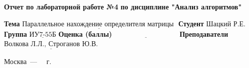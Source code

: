 \begin{titlepage}
	\begin{center}
		\noindent\begin{minipage}{1.3\textwidth}
					 \centering
					 \Large\textbf{  Отчет по лабораторной работе №4}\newline
					 \textbf{по дисциплине "Анализ алгоритмов"}\newline\newline
		\end{minipage}
	\end{center}

	\noindent\textbf{Тема} $\underline{\text{Параллельное нахождение определителя матрицы }}$\newline\newline
	\noindent\textbf{Студент} $\underline{\text{Шацкий Р.Е.}}$\newline\newline
	\noindent\textbf{Группа} $\underline{\text{ИУ7-55Б}}$\newline\newline
	\noindent\textbf{Оценка (баллы)} $\underline{\text{~~~~~~~~~~~~~~~~~~~~~~~~~~~}}$\newline\newline
	\noindent\textbf{Преподаватели} $\underline{\text{Волкова Л.Л., Строганов Ю.В.}}$\newline\newline\newline

	\begin{center}
		\vfill
		Москва~---~\the\year
		~г.
	\end{center}
\end{titlepage}
